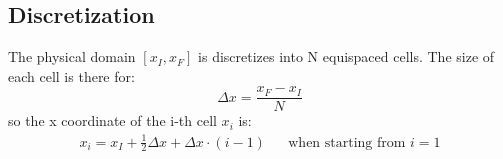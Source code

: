 \documentclass[11pt, a4paper]{article}
\begin{document}
\subsection{Discretization}
The physical domain $\left[x_I,x_F\right]$ is discretizes into N equispaced cells. The size of each cell is there for:
\begin{equation}
    \Delta x=\frac{x_F-x_I}{N}
\end{equation}
so the x coordinate of the i-th cell $x_i$ is:
\begin{equation}
    \begin{matrix}
        \displaystyle x_i=x_I+\frac{1}{2}\Delta x+\Delta x\cdot\left(i-1\right) && \text{when starting from $i=1$}
    \end{matrix}
\end{equation}
\end{document}
